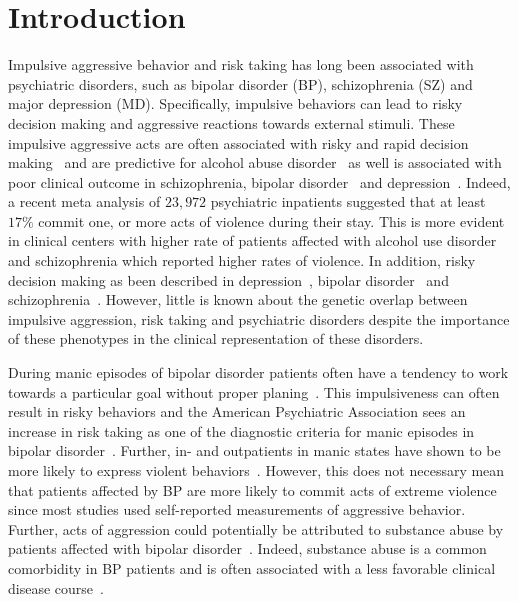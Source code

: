 \section*{Introduction}
\label{sec:introduction}

Impulsive aggressive behavior and risk taking has long been associated with psychiatric disorders, such as bipolar disorder (BP), schizophrenia (SZ) and major depression (MD).
Specifically, impulsive behaviors can lead to risky decision making and aggressive reactions towards external stimuli.  
These impulsive aggressive acts are often associated with risky and rapid decision making~\cite{Moeller2001} and are predictive for alcohol abuse disorder~\cite{Courtney2012} as well is associated with poor clinical outcome in schizophrenia, bipolar disorder~\cite{Gut-Fayand2001} and depression~\cite{Dutton2013}.
Indeed, a recent meta analysis of $23,972$ psychiatric inpatients suggested that at least $17\%$ commit one, or more acts of violence during their stay.
This is more evident in clinical centers with higher rate of patients affected with alcohol use disorder and schizophrenia which reported higher rates of violence. 
In addition, risky decision making as been described in depression~\cite{Wilson2010}, bipolar disorder~\cite{Johnson2012} and schizophrenia~\cite{Cheng2012}.
However, little is known about the genetic overlap between impulsive aggression, risk taking and psychiatric disorders despite the importance of these phenotypes in the clinical representation of these disorders.

During manic episodes of bipolar disorder patients often have a tendency to work towards a particular goal without proper planing~\cite{Johnson2012}.
This impulsiveness can often result in risky behaviors and the American Psychiatric Association sees an increase in risk taking as one of the diagnostic criteria for manic episodes in bipolar disorder~\cite{APA1994,AmericanPsychiatricAssociation2013}.
Further, in- and outpatients in manic states have shown to be more likely to express violent behaviors~\cite{Ballester2012}.
However, this does not necessary mean that patients affected by BP are more likely to commit acts of extreme violence since most studies used self-reported measurements of aggressive behavior.
Further, acts of aggression could potentially be attributed to substance abuse by patients affected with bipolar disorder~\cite{Fazel2010}.
Indeed, substance abuse is a common comorbidity in BP patients and is often associated with a less favorable clinical disease course~\cite{Cassidy2001}.

